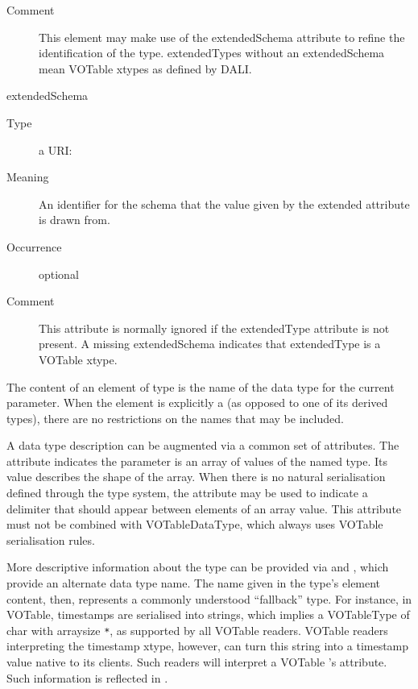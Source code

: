 \documentclass[11pt,a4paper]{ivoa}
\begin{document}
\begin{generated}
\begin{bigdescription}
\begin{description}
\item[Comment]
                     This element may make use of the extendedSchema
                     attribute to refine the identification of the
                     type.  extendedTypes without an extendedSchema
                     mean VOTable xtypes as defined by DALI.

\end{description}
\item[extendedSchema]
\begin{description}
\item[Type] a URI: 
\item[Meaning]
                     An identifier for the schema that the value given
                     by the extended attribute is drawn from.

\item[Occurrence] optional
\item[Comment]
                     This attribute is normally ignored if the
                     extendedType attribute is not present.  A missing
                     extendedSchema indicates that extendedType is a
                     VOTable xtype.

\end{description}


\end{bigdescription}\endgroup

\endgroup
\end{generated}


The content of an element of type  is the name
of the data type for the current parameter.  When the element is explicitly
a  (as opposed to one of its derived types),
there are no restrictions on the names that may be included.



A data type description can be augmented via a common set of
 attributes.  The
 attribute indicates the parameter is an array
of values of the named type.  Its value describes the shape of the
array. When there is no natural serialisation defined through the type
system, the  attribute may be used to indicate
a delimiter that should appear between elements of an array value.  This
attribute must not be combined with VOTableDataType, which always
uses VOTable serialisation rules.



More descriptive information about the type can be provided via
 and , which
provide an alternate data type name.  The name
given in the type's element content, then, represents a commonly
understood “fallback” type.  For instance, in VOTable, timestamps are
serialised into strings, which implies a VOTableType of char with
arraysize \verb|*|, as supported by all VOTable readers.  VOTable readers
interpreting the timestamp xtype, however, can turn this string into a
timestamp value native to its clients.  Such readers will interpret
a VOTable 's  attribute.
Such information is reflected in .
\end{document}
